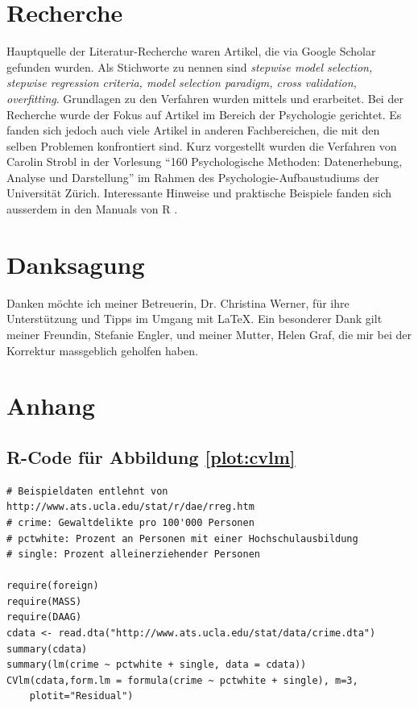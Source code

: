 \documentclass[german,12pt,doc]{apa}
\begin{document}


\section{Recherche}
Hauptquelle der Literatur-Recherche waren Artikel, die via Google Scholar gefunden wurden. Als Stichworte zu nennen sind \textit{stepwise model selection, stepwise regression criteria, model selection paradigm, cross validation, overfitting}. Grundlagen zu den Verfahren wurden mittels  und  erarbeitet. Bei der Recherche wurde der Fokus auf Artikel im Bereich der Psychologie gerichtet. Es fanden sich jedoch auch  viele Artikel in anderen Fachbereichen, die mit den selben Problemen konfrontiert sind. Kurz vorgestellt wurden die Verfahren von Carolin Strobl in der Vorlesung ``160 Psychologische Methoden: Datenerhebung, Analyse und Darstellung'' im Rahmen des Psychologie-Aufbaustudiums der Universität Zürich. Interessante Hinweise und praktische Beispiele fanden sich ausserdem in den Manuals von R \cite{R:core}.








\section*{Danksagung}
Danken möchte ich meiner Betreuerin, Dr. Christina Werner, für ihre Unterstützung und Tipps im Umgang mit \LaTeX. Ein besonderer Dank gilt meiner Freundin, Stefanie Engler, und meiner Mutter, Helen Graf, die mir bei der Korrektur massgeblich geholfen haben.  
\newpage
\printglossaries 
\newpage
 



\newpage
\section{Anhang}
\subsection*{R-Code für Abbildung \ref{plot:cvlm}}
\begin{verbatim}
# Beispieldaten entlehnt von http://www.ats.ucla.edu/stat/r/dae/rreg.htm
# crime: Gewaltdelikte pro 100'000 Personen
# pctwhite: Prozent an Personen mit einer Hochschulausbildung
# single: Prozent alleinerziehender Personen

require(foreign)
require(MASS)
require(DAAG)
cdata <- read.dta("http://www.ats.ucla.edu/stat/data/crime.dta")
summary(cdata)
summary(lm(crime ~ pctwhite + single, data = cdata))
CVlm(cdata,form.lm = formula(crime ~ pctwhite + single), m=3, 
    plotit="Residual")
\end{verbatim}
\newpage
\end{document}
